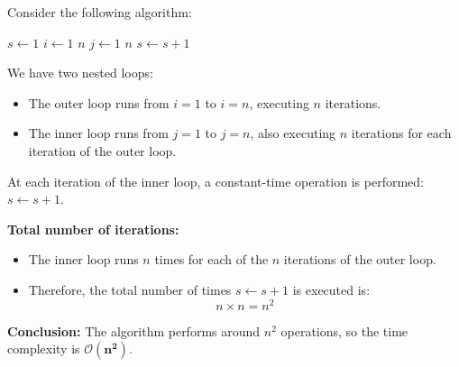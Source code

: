  \begin{example}

    Consider the following algorithm:
    
    \begin{codebox}
        \li $s \gets 1$
        \li \For $i \gets 1$ \To $n$ \Do
        \li     \For $j \gets 1$ \To $n$ \Do
        \li         $s \gets s + 1$
                \End
            \End
    \end{codebox}
    
    
    We have two nested \texttt{\For} loops:
    
    \begin{itemize}
        \item The outer loop runs from $i = 1$ to $i = n$, executing $n$ iterations.
        \item The inner loop runs from $j = 1$ to $j = n$, also executing $n$ iterations for each iteration of the outer loop.
    \end{itemize}
    
    At each iteration of the inner loop, a constant-time operation is performed: $s \gets s + 1$.
    
    \textbf{Total number of iterations:}
    
    \begin{itemize}
        \item The inner loop runs $n$ times for each of the $n$ iterations of the outer loop.
        \item Therefore, the total number of times $s \gets s + 1$ is executed is:
        \[ n \times n = n^2 \]
    \end{itemize}
    
    \textbf{Conclusion:} The algorithm performs around $n^2$ operations, so the time complexity is $\boldsymbol{\mathcal{O}(n^2)}$.
        
\end{example}

